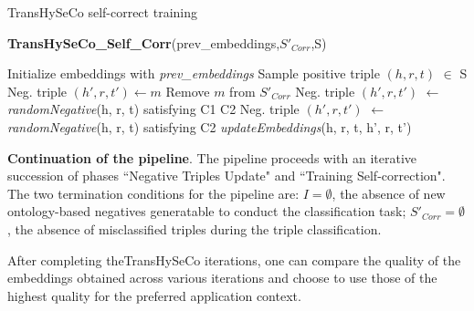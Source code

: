 \documentclass[sigconf]{acmart}
\newcommand{\TransHI}{TransHySeCo\xspace}
\begin{document}
\begin{algorithm}[t]
\caption{TransHySeCo self-correct training}
\begin{scriptsize}
\textbf{TransHySeCo\_Self\_Corr}(prev\_embeddings,$S'_{Corr}$,S)\\[-9pt]
    \begin{algorithmic}[1]
        \STATE Initialize embeddings with \textit{prev\_embeddings}
                \STATE Sample positive triple \((h, r, t)\) $\in$ S
                    \STATE Neg. triple \((h', r, t') \leftarrow m\)
                    \STATE Remove \(m\) from $S'_{Corr}$ 
                \ELSE
                    \STATE Neg. triple \((h', r, t')\) $\leftarrow$ \textit{randomNegative}(h, r, t) satisfying  C1 \AND C2
                    \ELSE
                        \STATE Neg. triple \((h', r, t')\) $\leftarrow$ \textit{randomNegative}(h, r, t) satisfying C2
                    \ENDIF
                \ENDIF
                                    \STATE 
                \textit{updateEmbeddings}(h, r, t, h', r, t')
            \ENDFOR
        \ENDFOR
    \end{algorithmic}
    \label{2iter pseudo}
\end{scriptsize}
\end{algorithm}

\noindent\textbf{Continuation of the pipeline}.
The pipeline proceeds with an iterative succession of phases ``Negative Triples Update" and ``Training Self-correction".
The two termination conditions for the pipeline are: $I = \emptyset$, the absence of new ontology-based negatives generatable to conduct the classification task; $S'_{Corr} = \emptyset$, the absence of misclassified triples during the triple classification.

After completing  the\TransHI iterations, one can compare the quality of the embeddings obtained across various iterations and choose to use those of the highest quality for the preferred application context.

\end{document}
